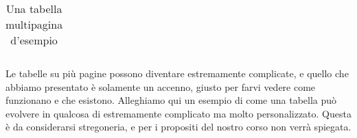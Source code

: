 \begin{center}
\begin{longtable}{llll}
\caption{Una tabella multipagina d'esempio}
\label{tabella:esempio_tabella_lunga}
\end{longtable}
\end{center}

Le tabelle su più pagine possono diventare estremamente complicate, e quello
che abbiamo presentato è solamente un accenno, giusto per farvi vedere come
funzionano e che esistono.
Alleghiamo qui un esempio di come una tabella può evolvere in qualcosa di
estremamente complicato ma molto personalizzato. Questa è da considerarsi
stregoneria, e per i propositi del nostro corso non verrà spiegata.


